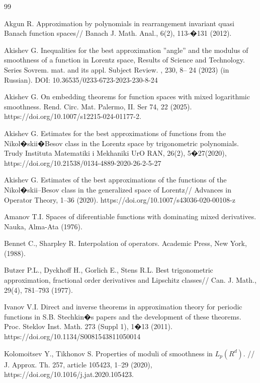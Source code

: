 \documentclass[12pt]{article}
\theoremstyle{plain}
\begin{document}
 
\begin{thebibliography}{99}

 Akgun R. Approximation by polynomials in rearrangement invariant quasi Banach function spaces// Banach J. Math. Anal.,  6(2), 113-�131 (2012).

  Akishev G. Inequalities for the best approximation ''angle'' and the modulus
of smoothness of a function in Lorentz space, Results of Science and Technology. Series Sovrem.
mat. and its appl. Subject Review. , 230, 8--
24 (2023) (in Russian).
DOI: 10.36535/0233-6723-2023-230-8-24 
 
   Akishev G. On embedding theorems for function spaces with mixed logarithmic smoothness. Rend. Circ. Mat. Palermo, II. Ser 74, 22 (2025). https://doi.org/10.1007/s12215-024-01177-2.

Akishev G. Estimates for the best approximations of functions from the Nikol�skii�Besov class in
the Lorentz space by trigonometric polynomials. Trudy Instituta Matematiki i Mekhaniki UrO RAN,
26(2), 5�27(2020), https://doi.org/10.21538/0134-4889-2020-26-2-5-27

  Akishev G. Estimates of the best approximations of the functions
of the Nikol�skii--Besov class in the generalized space of Lorentz// Advances in Operator Theory, 1--36 (2020). https://doi.org/10.1007/s43036-020-00108-z

  Amanov T.I. Spaces of diferentiable functions with dominating mixed derivatives. Nauka, Alma-Ata (1976).
 
  Bennet C., Sharpley R. Interpolation of operators. Academic Press, New York, (1988). %
 
   Butzer P.L.,  Dyckhoff H.,  Gorlich E.,   Stens R.L. Best trigonometric approximation, fractional order derivatives and  Lipschitz classes// Can. J. Math., 29(4), 781--793 (1977).

 Ivanov V.I. Direct and inverse theorems in approximation theory for periodic functions in S.B. Stechkin�s papers and the development of these theorems. Proc. Steklov Inst. Math. 273 (Suppl 1), 1�13 (2011). https://doi.org/10.1134/S0081543811050014 

  Kolomoitsev Y., Tikhonov S. Properties of moduli of smoothness in $L_ {p}(R^{d})$. // J. Approx. Th.  257, article 105423, 1--29 (2020),  
https://doi.org/10.1016/j.jat.2020.105423.


\end{thebibliography}
\end{document}
